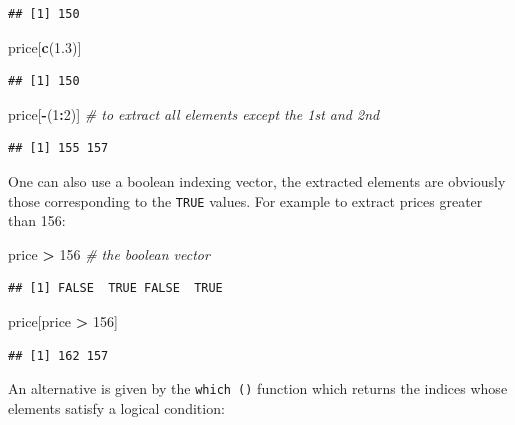 \documentclass[]{book}
\newenvironment{Shaded}{\begin{snugshade}}{\end{snugshade}}
\newcommand{\CommentTok}[1]{\textcolor[rgb]{0.56,0.35,0.01}{\textit{#1}}}
\newcommand{\DecValTok}[1]{\textcolor[rgb]{0.00,0.00,0.81}{#1}}
\newcommand{\FloatTok}[1]{\textcolor[rgb]{0.00,0.00,0.81}{#1}}
\newcommand{\KeywordTok}[1]{\textcolor[rgb]{0.13,0.29,0.53}{\textbf{#1}}}
\newcommand{\NormalTok}[1]{#1}
\newcommand{\OperatorTok}[1]{\textcolor[rgb]{0.81,0.36,0.00}{\textbf{#1}}}
\newcommand{\StringTok}[1]{\textcolor[rgb]{0.31,0.60,0.02}{#1}}
\begin{document}
\begin{verbatim}
## [1] 150
\end{verbatim}

\begin{Shaded}
\begin{Highlighting}[]
\NormalTok{price[}\KeywordTok{c}\NormalTok{(}\FloatTok{1.3}\NormalTok{)]}
\end{Highlighting}
\end{Shaded}

\begin{verbatim}
## [1] 150
\end{verbatim}

\begin{Shaded}
\begin{Highlighting}[]
\NormalTok{price[}\OperatorTok{-}\NormalTok{(}\DecValTok{1}\OperatorTok{:}\DecValTok{2}\NormalTok{)] }\CommentTok{# to extract all elements except the 1st and 2nd}
\end{Highlighting}
\end{Shaded}

\begin{verbatim}
## [1] 155 157
\end{verbatim}

One can also use a boolean indexing vector, the extracted elements are obviously those corresponding to the \texttt{TRUE} values. For example to extract prices greater than 156:

\begin{Shaded}
\begin{Highlighting}[]
\NormalTok{price }\OperatorTok{>}\StringTok{ }\DecValTok{156} \CommentTok{# the boolean vector}
\end{Highlighting}
\end{Shaded}

\begin{verbatim}
## [1] FALSE  TRUE FALSE  TRUE
\end{verbatim}

\begin{Shaded}
\begin{Highlighting}[]
\NormalTok{price[price }\OperatorTok{>}\StringTok{ }\DecValTok{156}\NormalTok{]}
\end{Highlighting}
\end{Shaded}

\begin{verbatim}
## [1] 162 157
\end{verbatim}

An alternative is given by the \texttt{which\ ()} function which returns the indices whose elements satisfy a logical condition:
\end{document}
